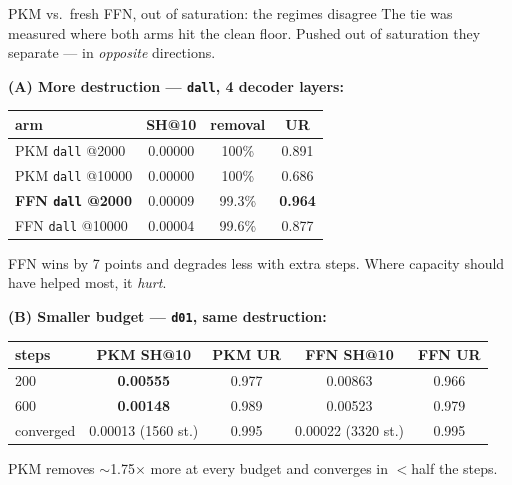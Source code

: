 \documentclass{beamer}
\begin{document}
\begin{frame}{PKM vs.\ fresh FFN, out of saturation: the regimes disagree}
The tie was measured where both arms hit the clean floor. Pushed out of
saturation they separate --- in \emph{opposite} directions.

\medskip
\textbf{(A) More destruction --- \texttt{dall}, 4 decoder layers:}
\begin{center}
\begin{tabular}{|l|c|c|c|}
\hline
arm & SH@10 & removal & UR \\
\hline
PKM \texttt{dall} @2000   & 0.00000 & 100\%  & 0.891 \\
PKM \texttt{dall} @10000  & 0.00000 & 100\%  & 0.686 \\
\textbf{FFN \texttt{dall} @2000}  & 0.00009 & 99.3\% & \textbf{0.964} \\
FFN \texttt{dall} @10000  & 0.00004 & 99.6\% & 0.877 \\
\hline
\end{tabular}
\end{center}
\alert{FFN wins by 7 points} and degrades less with extra steps. Where capacity
should have helped most, it \emph{hurt}.

\medskip
\textbf{(B) Smaller budget --- \texttt{d01}, same destruction:}
\begin{center}
\begin{tabular}{|l|c|c|c|c|}
\hline
steps & PKM SH@10 & PKM UR & FFN SH@10 & FFN UR \\
\hline
200        & \textbf{0.00555} & 0.977 & 0.00863 & 0.966 \\
600        & \textbf{0.00148} & 0.989 & 0.00523 & 0.979 \\
converged  & 0.00013 (1560 st.) & 0.995 & 0.00022 (3320 st.) & 0.995 \\
\hline
\end{tabular}
\end{center}
\alert{PKM removes $\sim$1.75$\times$ more at every budget} and converges in
$<$half the steps.
\end{frame}
\end{document}
